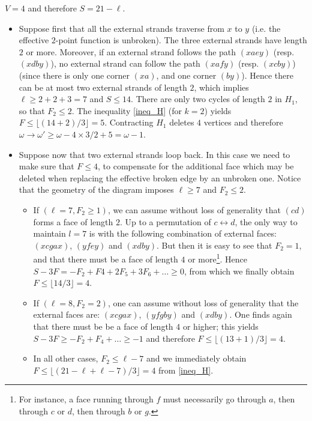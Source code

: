 \documentclass[10pt]{article}
\theoremstyle{plain}
\theoremstyle{definition}
\begin{document}
 $V= 4$ and therefore $S = 21 - \ell$.
\begin{itemize}

\item Suppose first that all the external strands traverse from $x$ to $y$ (i.e. the effective $2$-point function is unbroken). The three external strands have length $2$ or more. Moreover, if an external strand follows the path $(x a e y)$ (resp. $(x d b y)$), no external strand can follow the path $(x a f y)$ (resp. $(x c b y)$) (since there is only one corner $(x a)$, and one corner $(b y)$). Hence there can be at most two external strands of length $2$, which implies $\ell \geq 2+2+3= 7$ and $S \leq 14$. There are only two cycles of length $2$ in $H_1$, so that $F_2 \leq 2$. The inequality \eqref{ineq_H} (for $k=2$) yields $F \leq  \lfloor (14 + 2)/3 \rfloor = 5$. Contracting $H_1$ deletes $4$ vertices and therefore 
$\omega \to \omega' \geq \omega - 4\times 3 / 2 + 5 =  \omega - 1$.

\item Suppose now that two external strands loop back. In this case we need to make sure that $F \leq 4$, to compensate for the additional face which may be deleted when replacing the effective broken edge by an unbroken one. Notice that the geometry of the diagram imposes $\ell \geq 7$ and $F_2 \leq 2$.\begin{itemize}
\item If $(\ell = 7, F_2 \geq 1)$, we can assume without loss of generality that $(cd)$ forms a face of length $2$. Up to a permutation of $c \leftrightarrow d$, the only way to maintain $l=7$ is with the following combination of external faces: $(xcgax)$, $(yfey)$ and $(xdby)$. But then it is easy to see that $F_2=1$, and that there must be a face of length $4$ or more\footnote{For instance, a face running through $f$ must necessarily go through $a$, then through $c$ or $d$, then through $b$ or $g$.}. Hence $S - 3 F = -F_2 + F4 + 2 F_5 + 3 F_6 + \ldots \geq 0$, from which we finally obtain $F \leq \lfloor 14/3 \rfloor = 4$.

\item If $(\ell = 8, F_2 = 2)$, one can assume without loss of generality that the external faces are: $(xcgax)$, $(yfgby)$ and $(xdby)$. One finds again that there must be be a face of length $4$ or higher; this yields $S-3F \geq - F_2 + F_4 + \ldots \geq -1 $ and therefore $F \leq \lfloor (13 +1)/3 \rfloor = 4$.

\item In all other cases, $F_2 \leq \ell- 7$ and we immediately obtain $F \leq  \lfloor ( 21 - \ell + \ell - 7)/3 \rfloor = 4$ from \eqref{ineq_H}. 
\end{itemize}

\end{itemize}
\end{document}
